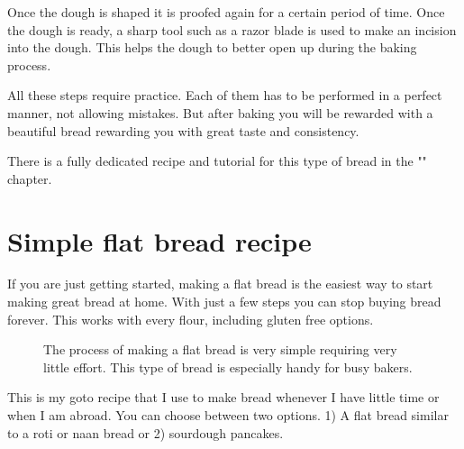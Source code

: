 Once the dough is shaped it is proofed again for a certain
period of time. Once the dough is ready, a sharp tool such
as a razor blade is used to make an incision into the dough.
This helps the dough to better open up during the baking process.

All these steps require practice. Each of them has to be
performed in a perfect manner, not allowing mistakes.
But after baking you will be rewarded with a beautiful bread
rewarding you with great taste and consistency.

There is a fully dedicated recipe and tutorial
for this type of bread in the "" chapter.

\section{Simple flat bread recipe}
\label{section:flat-bread-recipe}

If you are just getting started, making a flat bread is the
easiest way to start making great bread at home. With just a
few steps you can stop buying bread forever. This works with
every flour, including gluten free options.

\begin{figure}[!htb]
  \caption{The process of making a flat bread is very simple requiring very little effort. This
  type of bread is especially handy for busy bakers.}
  \label{fig:flat-bread-process}
\end{figure}

This is my goto recipe that I use to make bread whenever
I have little time or when I am abroad. You can choose
between two options. 1) A flat bread similar to a roti or naan bread
or 2) sourdough pancakes.

